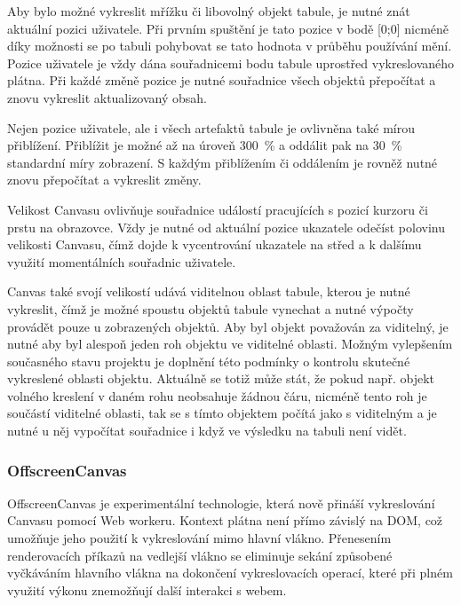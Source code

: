 Aby bylo možné vykreslit mřížku či libovolný objekt tabule, je nutné znát aktuální pozici uživatele.
Při prvním spuštění je tato pozice v bodě [0;0] nicméně díky možnosti se po tabuli pohybovat se tato hodnota v průběhu používání mění.
Pozice uživatele je vždy dána souřadnicemi bodu tabule uprostřed vykreslovaného plátna.
Při každé změně pozice je nutné souřadnice všech objektů přepočítat a znovu vykreslit aktualizovaný obsah.

Nejen pozice uživatele, ale i všech artefaktů tabule je ovlivněna také mírou přiblížení.
Přiblížit je možné až na úroveň 300~\% a oddálit pak na 30~\% standardní míry zobrazení.
S každým přiblížením či oddálením je rovněž nutné znovu přepočítat a vykreslit změny.

Velikost Canvasu ovlivňuje souřadnice událostí pracujících s pozicí kurzoru či prstu na obrazovce.
Vždy je nutné od aktuální pozice ukazatele odečíst polovinu velikosti Canvasu, čímž dojde k vycentrování ukazatele na střed a k dalšímu využití momentálních souřadnic uživatele.

Canvas také svojí velikostí udává viditelnou oblast tabule, kterou je nutné vykreslit, čímž je možné spoustu objektů tabule vynechat a nutné výpočty provádět pouze u zobrazených objektů.
Aby byl objekt považován za viditelný, je nutné aby byl alespoň jeden roh objektu ve viditelné oblasti.
Možným vylepšením současného stavu projektu je doplnění této podmínky o kontrolu skutečné vykreslené oblasti objektu.
Aktuálně se totiž může stát, že pokud např. objekt volného kreslení v daném rohu neobsahuje žádnou čáru, nicméně tento roh je součástí viditelné oblasti, tak se s tímto objektem počítá jako s viditelným a je nutné u něj vypočítat souřadnice i když ve výsledku na tabuli není vidět.


\subsubsection{OffscreenCanvas}
OffscreenCanvas je experimentální technologie, která nově přináší vykreslování Canvasu pomocí Web workeru.
Kontext plátna není přímo závislý na DOM, což umožňuje jeho použití k vykreslování mimo hlavní vlákno. \cite{web:MDN/OffscreenCanvas}
Přenesením renderovacích příkazů na vedlejší vlákno se eliminuje sekání způsobené vyčkáváním hlavního vlákna na dokončení vykreslovacích operací, které při plném využití výkonu znemožňují další interakci s webem.

